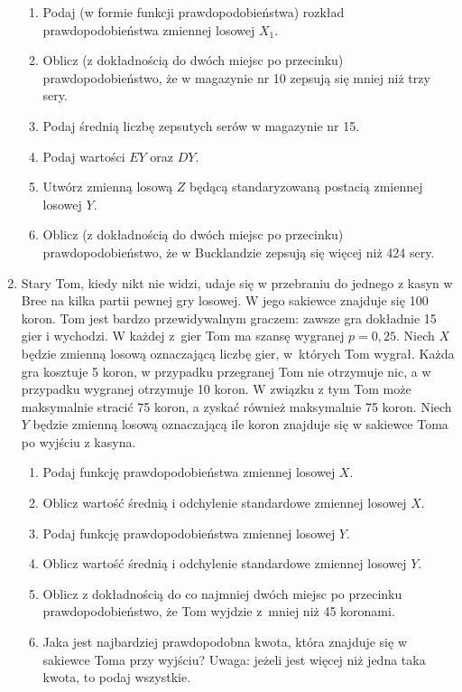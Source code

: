 \documentclass[twoside]{mwart}
\begin{document}
\begin{enumerate}
\begin{enumerate}
\item Podaj  (w formie funkcji prawdopodobieństwa) rozkład prawdopodobieństwa zmiennej losowej $X_1$.
\item Oblicz (z dokładnością do dwóch miejsc po przecinku) prawdopodobieństwo, że w magazynie nr 10 zepsują się mniej niż trzy sery.
\item Podaj średnią liczbę zepsutych serów w magazynie nr 15.
\item Podaj wartości $EY$ oraz $DY$.
\item Utwórz zmienną losową $Z$ będącą standaryzowaną postacią zmiennej losowej $Y$.
\item Oblicz (z dokładnością do dwóch miejsc po przecinku) prawdopodobieństwo, że w Bucklandzie zepsują się więcej niż 424 sery.
\end{enumerate}

\item Stary Tom, kiedy nikt nie widzi, udaje się w przebraniu do jednego z kasyn w Bree na kilka partii pewnej gry losowej.
W jego sakiewce znajduje się 100 koron.
Tom jest bardzo przewidywalnym graczem: zawsze gra dokładnie 15 gier i wychodzi.
W każdej z~gier Tom ma szansę wygranej $p=0{,}25$.
Niech $X$ będzie zmienną losową oznaczającą liczbę gier, w~których Tom wygrał.
Każda gra kosztuje 5 koron, w przypadku przegranej Tom nie otrzymuje nic, a w przypadku wygranej otrzymuje 10 koron.
W związku z tym Tom może maksymalnie stracić 75 koron, a zyskać również maksymalnie 75 koron.
Niech $Y$ będzie zmienną losową oznaczającą ile koron znajduje się w sakiewce Toma po wyjściu z kasyna.

\begin{enumerate}
	\item Podaj funkcję prawdopodobieństwa zmiennej losowej $X$.
	\item Oblicz wartość średnią i odchylenie standardowe zmiennej losowej $X$.
	\item Podaj funkcję prawdopodobieństwa zmiennej losowej $Y$.
	\item Oblicz wartość średnią i odchylenie standardowe zmiennej losowej $Y$.
	\item Oblicz z dokładnością do co najmniej dwóch miejsc po przecinku prawdopodobieństwo, że Tom wyjdzie z~mniej niż 45 koronami.
	\item Jaka jest najbardziej prawdopodobna kwota, która znajduje się w sakiewce Toma przy wyjściu? Uwaga: jeżeli jest więcej
		niż jedna taka kwota, to podaj wszystkie.
\end{enumerate}


\end{enumerate}
\end{document}

